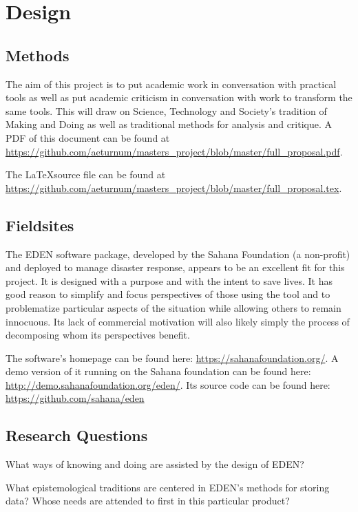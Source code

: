 \documentclass[a4paper,man,natbib]{apa6}
\begin{document}
   \section*{Design}
   \subsection*{Methods}
   The aim of this project is to put academic work in conversation with practical tools as well as put academic criticism in conversation with work to  transform the same tools. This will draw on Science, Technology and Society's tradition of Making and Doing as well as traditional methods for analysis and critique.
   A PDF of this document can be found at \url{https://github.com/aeturnum/masters_project/blob/master/full_proposal.pdf}.

   The \LaTeX source file can be found at \url{https://github.com/aeturnum/masters_project/blob/master/full_proposal.tex}.
   \subsection*{Fieldsites}

   The EDEN software package, developed by the Sahana Foundation (a non-profit) and deployed to manage disaster response, appears to be an excellent fit for this project. It is designed with a purpose and with the intent to save lives. It has good reason to simplify and focus perspectives of those using the tool and to problematize particular aspects of the situation while allowing others to remain innocuous. Its lack of commercial motivation will also likely simply the process of decomposing whom its perspectives benefit.

   The software's homepage can be found here: \url{https://sahanafoundation.org/}. A demo version of it running on the Sahana foundation can be found here: \url{http://demo.sahanafoundation.org/eden/}. Its source code can be found here: \url{https://github.com/sahana/eden}
   \subsection*{Research Questions}
   What ways of knowing and doing are assisted by the design of EDEN?

   What epistemological traditions are centered in EDEN's methods for storing data? Whose needs are attended to first in this particular product?
\end{document}
